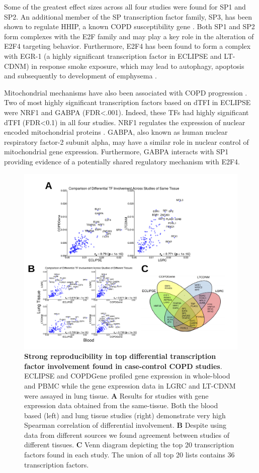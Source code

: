 Some of the greatest effect sizes across all four studies were found for SP1 and SP2.  An additional member of the SP transcription factor family, SP3, has been shown to regulate HHIP, a known COPD susceptibility gene \cite{zhou2012identification}. Both SP1 and SP2 form complexes with the E2F family \cite{rotheneder1999transcription, karlseder1996interaction} and may play a key role in the alteration of E2F4 targeting behavior. Furthermore, E2F4 has been found to form a complex with EGR-1 (a highly significant transcription factor in ECLIPSE and LT-CDNM) in response smoke exposure, which may lead to autophagy, apoptosis and subsequently to development of emphysema \cite{chen2008egr}. 

Mitochondrial mechanisms have also been associated with COPD progression \cite{cloonan2016mitochondrial}. Two of most highly significant transcription factors based on dTFI in ECLIPSE  were NRF1 and GABPA (FDR<.001). Indeed, these TFs had highly significant dTFI (FDR<0.1) in all four studies. NRF1 regulates the expression of nuclear encoded mitochondrial proteins \cite{gopalakrishnan1995structure}. GABPA, also known as human nuclear respiratory factor-2 subunit alpha, may have a similar role in nuclear control of mitochondrial gene expression. Furthermore, GABPA interacts with SP1 \cite{galvagni2001sp1} providing evidence of a potentially shared regulatory mechanism with E2F4.

\begin{figure}
\includegraphics[width=.8\linewidth]{figures/figure3}
\caption{\textbf{Strong reproducibility in top differential transcription factor involvement found in case-control COPD studies}. ECLIPSE and COPDGene
profiled gene expression in whole-blood and PBMC while the gene expression data in LGRC and LT-CDNM were assayed in lung tissue. \textbf{A} Results for studies with gene expression data obtained from the same-tissue. Both the blood based (left) and lung tissue studies (right) demonstrate very high Spearman correlation of differential involvement. \textbf{B} Despite using data from different sources we found agreement between studies of different tissues. \textbf{C} Venn diagram depicting the top 20 transcription factors found in each study. The union of all top 20 lists contains 36  transcription factors.}
\label{fig:compare}
\end{figure}

